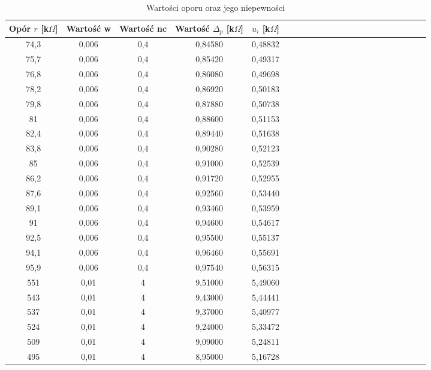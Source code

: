 \documentclass[10pt,a4paper]{article}
\begin{document}
\begin{center}
\begin{center}
\begin{table}[h!]
\begin{tabular}{|c|c|c|c|c|c|c|c|c|c|c|c|c|c|c|c|c|c|c|c|c|c|}
 \end{tabular}
 \end{table}
 \end{center}




\begin{center}
 \begin{table}[h!]
 \centering
 \caption{Wartości oporu oraz jego niepewności}
 \label{t2}
 \begin{tabular}{|c|c|c|c|c|c|c|c|c|c|c|c|c|c|c|c|c|c|c|c|c|c|}
 \hline
Opór $r$ [k$\Omega$]&Wartość w& Wartość nc&Wartość $\Delta_{p}$ [k$\Omega$]& $u_{i}$ [k$\Omega$]\\ 
\hline
74,3 & 0,006 & 0,4 & 0,84580 & 0,48832 \\ \hline
75,7 & 0,006 & 0,4 & 0,85420 & 0,49317 \\ \hline
76,8 & 0,006 & 0,4 & 0,86080 & 0,49698 \\ \hline
78,2 & 0,006 & 0,4 & 0,86920 & 0,50183 \\ \hline
79,8 & 0,006 & 0,4 & 0,87880 & 0,50738 \\ \hline
81   & 0,006 & 0,4 & 0,88600 & 0,51153 \\ \hline
82,4 & 0,006 & 0,4 & 0,89440 & 0,51638 \\ \hline
83,8 & 0,006 & 0,4 & 0,90280 & 0,52123 \\ \hline
85   & 0,006 & 0,4 & 0,91000 & 0,52539 \\ \hline
86,2 & 0,006 & 0,4 & 0,91720 & 0,52955 \\ \hline
87,6 & 0,006 & 0,4 & 0,92560 & 0,53440 \\ \hline
89,1 & 0,006 & 0,4 & 0,93460 & 0,53959 \\ \hline
91   & 0,006 & 0,4 & 0,94600 & 0,54617 \\ \hline
92,5 & 0,006 & 0,4 & 0,95500 & 0,55137 \\ \hline
94,1 & 0,006 & 0,4 & 0,96460 & 0,55691 \\ \hline
95,9 & 0,006 & 0,4 & 0,97540 & 0,56315 \\ \hline
551  & 0,01  & 4   & 9,51000 & 5,49060 \\ \hline
543  & 0,01  & 4   & 9,43000 & 5,44441 \\ \hline
537  & 0,01  & 4   & 9,37000 & 5,40977 \\ \hline
524  & 0,01  & 4   & 9,24000 & 5,33472 \\ \hline
509  & 0,01  & 4   & 9,09000 & 5,24811 \\ \hline
495  & 0,01  & 4   & 8,95000 & 5,16728 \\ \hline

\end{tabular}
\end{table}
\end{center}
\end{center}
\end{document}
